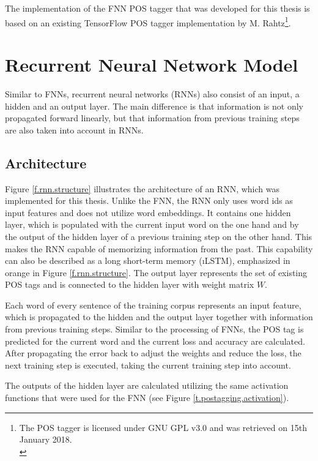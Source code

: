 The implementation of the FNN POS tagger that was developed for this thesis is based on an existing TensorFlow POS tagger implementation by M. Rahtz\footnote{The POS tagger is licensed under GNU GPL v3.0 and was retrieved on 15th January 2018.\\}.

\section{Recurrent Neural Network Model}\label{c.postagging.rnn}
Similar to FNNs, recurrent neural networks (RNNs) also consist of an input, a hidden and an output layer. The main difference is that information is not only propagated forward linearly, but that information from previous training steps are also taken into account in RNNs.

\subsection{Architecture}\label{c.postagging.rnn.architecture}
Figure \ref{f.rnn.structure} illustrates the architecture of an RNN, which was implemented for this thesis. Unlike the FNN, the RNN only uses word ids as input features and does not utilize word embeddings. It contains one hidden layer, which is populated with the current input word on the one hand and by the output of the hidden layer of a previous training step on the other hand. This makes the RNN capable of memorizing information from the past. This capability can also be described as a long short-term memory (\i{LSTM}), emphasized in orange in Figure \ref{f.rnn.structure}. The output layer represents the set of existing POS tags and is connected to the hidden layer with weight matrix
$W$.

Each word of every sentence of the training corpus represents an input feature, which is propagated to the hidden and the output layer together with information from previous training steps. Similar to the processing of FNNs, the POS tag is predicted for the current word and the current loss and accuracy are calculated. After propagating the error back to adjust the weights and reduce the loss, the next training step is executed, taking the current training step into account.

The outputs of the hidden layer are calculated utilizing the same activation functions that were used for the FNN (see Figure \ref{t.postagging.activation}).

